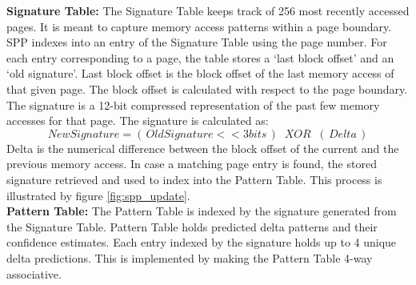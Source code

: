 \noindent \textbf{Signature Table:} The Signature Table keeps track of 256 most recently
accessed pages. It is meant to capture memory access patterns within a page
boundary. SPP indexes into an entry of the Signature Table using the page
number. For each entry corresponding to a page, the table stores a `last
block offset' and an `old signature'. Last block offset is the block offset
of the last memory access of that given page. The block offset is calculated
with respect to the page boundary. The signature is a 12-bit compressed
representation of the past few memory accesses for that page. The signature
is calculated as: $$New Signature = (\,Old Signature << 3 bits\,) \;\;XOR\;\;
(\,Delta\,)$$ Delta is the numerical difference between the block offset of
the current and the previous memory access. In case a matching page entry is
found, the stored signature retrieved and used to index into the Pattern
Table. This process is illustrated by figure \ref{fig:spp_update}.\\

\noindent \textbf{Pattern Table:} The Pattern Table is indexed by the signature
generated from the Signature Table. Pattern Table holds predicted delta
patterns and their confidence estimates. Each entry indexed by the signature
holds up to 4 unique delta predictions. This is implemented by making the
Pattern Table 4-way associative.\\



